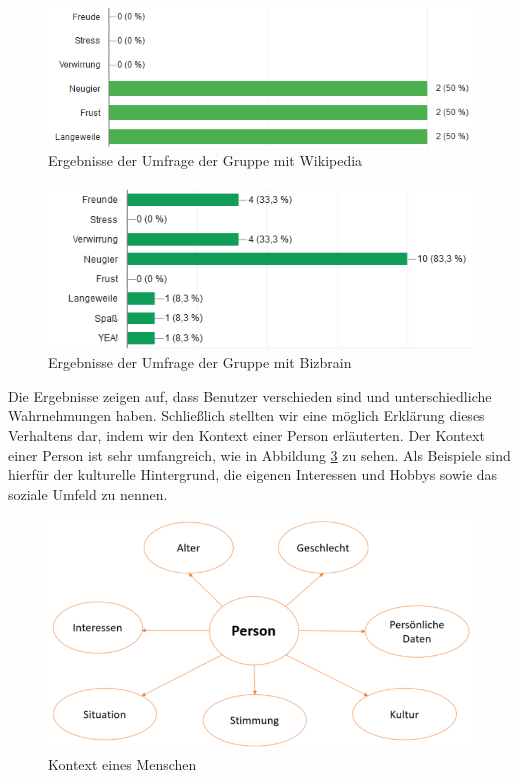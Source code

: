 \begin{figure}[!h]
	\centering
	\includegraphics[width=1\linewidth]{Pictures/wiki_kaffee}
	\caption[Ergebnis der grafischen Website]{Ergebnisse der Umfrage der Gruppe mit Wikipedia}
	\label{fig:ergebnis_1}
\end{figure}



\begin{figure}[!h]
	\centering
	\includegraphics[width=1\linewidth]{Pictures/bizbuzz}
	\caption[Ergebnis von Wikipedia]{Ergebnisse der Umfrage der Gruppe mit Bizbrain}
	\label{fig:ergebnis_2}
\end{figure}

Die Ergebnisse zeigen auf, dass Benutzer verschieden sind und unterschiedliche Wahrnehmungen haben. Schließlich stellten wir eine möglich Erklärung dieses Verhaltens dar, indem wir den Kontext einer Person erläuterten. Der Kontext einer Person ist sehr umfangreich, wie in Abbildung \ref{fig:contextmensch} zu sehen. Als Beispiele sind hierfür der kulturelle Hintergrund, die eigenen Interessen und Hobbys sowie das soziale Umfeld zu nennen.

\begin{figure}[h!]
	\centering
	\includegraphics[width=1\linewidth]{Pictures/Context_Mensch}
	\caption[Kontext eines Menschen]{Kontext eines Menschen}
	\label{fig:contextmensch}
\end{figure}





